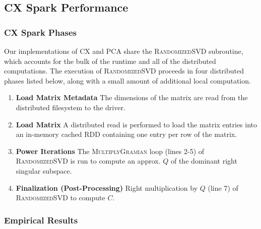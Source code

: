   \subsection{CX Spark Performance} %

  \subsubsection{CX Spark Phases}
  Our implementations of CX and PCA share the \textsc{RandomizedSVD} subroutine, which accounts for the bulk of the runtime and all of the distributed computations.
  The execution of \textsc{RandomizedSVD} proceeds in four distributed phases listed below, along with a small amount of additional local computation.
  \begin{enumerate}
      \item \textbf{Load Matrix Metadata}
         The dimensions of the matrix are read from the distributed filesystem to the driver.
      \item \textbf{Load Matrix}
         A distributed read is performed to load the matrix entries into an in-memory cached
         RDD containing one entry per row of the matrix.
      \item \textbf{Power Iterations}
          The \textsc{MultiplyGramian} loop (lines 2-5) of
         \textsc{RandomizedSVD} is run to compute an approx. $Q$
         of the dominant right singular subspace.
       \item \textbf{Finalization (Post-Processing)}
           Right multiplication by $Q$ (line 7) of \textsc{RandomizedSVD} to compute $C$.
  \end{enumerate}

  \subsubsection{Empirical Results}

